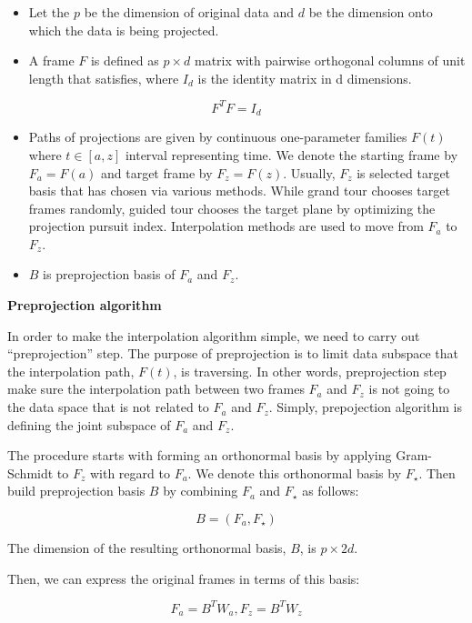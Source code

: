 \begin{itemize}
\item
  Let the \(p\) be the dimension of original data and \(d\) be the dimension onto which the data is being projected.
\item
  A frame \(F\) is defined as \(p\times d\) matrix with pairwise orthogonal columns of unit length that satisfies, where \(I_d\) is the identity matrix in d dimensions.
\end{itemize}

\[F^TF = I_d\]

\begin{itemize}
\item
  Paths of projections are given by continuous one-parameter families \(F(t)\) where \(t\in [a, z]\) interval representing time. We denote the starting frame by \(F_a = F(a)\) and target frame by \(F_z = F(z)\). Usually, \(F_z\) is selected target basis that has chosen via various methods. While grand tour chooses target frames randomly, guided tour chooses the target plane by optimizing the projection pursuit index. Interpolation methods are used to move from \(F_a\) to \(F_z\).
\item
  \(B\) is preprojection basis of \(F_a\) and \(F_z\).
\end{itemize}

\textbf{Preprojection algorithm}

In order to make the interpolation algorithm simple, we need to carry out ``preprojection'' step.
The purpose of preprojection is to limit data subspace that the interpolation path, \(F(t)\), is traversing. In other words, preprojection step make sure the interpolation path between two frames \(F_a\) and \(F_z\) is not going to the data space that is not related to \(F_a\) and \(F_z\). Simply, prepojection algorithm is defining the joint subspace of \(F_a\) and \(F_z\).

The procedure starts with forming an orthonormal basis by applying Gram-Schmidt to \(F_z\) with regard to \(F_a\). We denote this orthonormal basis by \(F_\star\). Then build preprojection basis \(B\) by combining \(F_a\) and \(F_\star\) as follows:

\[B = (F_a, F_{\star})\]

The dimension of the resulting orthonormal basis, \(B\), is \(p\times 2d\).

Then, we can express the original frames in terms of this basis:

\[F_a = B^TW_a, F_z = B^TW_z\]

